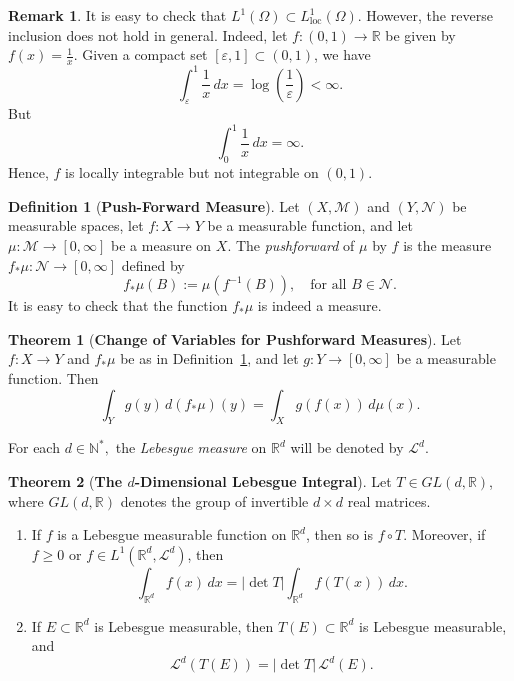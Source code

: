 \documentclass[12pt,a4paper]{report}
\theoremstyle{definition}
\newtheorem{theorem}{Theorem}
\newtheorem{definition}{Definition}
\newtheorem{remark}{Remark}
\begin{document}
\begin{remark}
It is easy to check that \( L^1(\Omega) \subset L^1_{\mathrm{loc}}(\Omega) \). However, the reverse inclusion does not hold in general. Indeed, let \( f : (0,1) \to \mathbb{R} \) be given by $f(x) = \frac{1}{x}$. Given a compact set \( [\varepsilon,1] \subset (0,1) \), we have
\[
\int_\varepsilon^1 \frac{1}{x} \, dx = \log\left(\frac{1}{\varepsilon}\right) < \infty.
\]
But
\[
\int_0^1 \frac{1}{x} \, dx = \infty.
\]
Hence, \( f \) is locally integrable but not integrable on \( (0,1) \).
\end{remark}


\begin{definition} [\textbf{Push-Forward Measure}] \label{pushforward}
Let \( (X, \mathcal{M}) \) and \( (Y, \mathcal{N}) \) be measurable spaces, let \( f : X \to Y \) be a measurable function, and let \( \mu : \mathcal{M} \to [0, \infty] \) be a measure on \( X \). The \textit{pushforward} of \( \mu \) by \( f \) is the measure \( f_*\mu : \mathcal{N} \to [0, \infty] \) defined by
\[
f_*\mu(B) := \mu(f^{-1}(B)), \quad \text{for all } B \in \mathcal{N}.
\]
It is easy to check that the function $f_*\mu$ is indeed a measure.
\end{definition}

\begin{theorem}[\textbf{Change of Variables for Pushforward Measures}] \label{lem:changeofvariable-pushforward}
Let \( f : X \to Y \) and \( f_* \mu \) be as in Definition~\ref{pushforward}, and let \( g : Y \to [0, \infty] \) be a measurable function. Then
\[
\int_Y g(y) \, d(f_* \mu)(y) = \int_X g(f(x)) \, d\mu(x).
\]
\end{theorem}

\noindent For each $d \in \mathbb{N}^*,$ the \textit{Lebesgue measure} on $\mathbb{R}^d$ will be denoted by $\mathcal{L}^d$.

\begin{theorem}[\textbf{The $d$-Dimensional Lebesgue Integral}] \label{thm2.45}
Let \( T \in GL(d, \mathbb{R}) \), where \( GL(d, \mathbb{R}) \) denotes the group of invertible \( d \times d \) real matrices.
\begin{enumerate}
    \item[(a)] If \( f \) is a Lebesgue measurable function on \( \mathbb{R}^d \), then so is \( f \circ T \). Moreover, if \( f \ge 0 \) or \( f \in L^1(\mathbb{R}^d, \mathcal{L}^d) \), then
    \[
    \int_{\mathbb{R}^d} f(x) \, dx = |\det T| \int_{\mathbb{R}^d} f(T(x)) \, dx.
    \]

    \item[(b)] If \( E \subset \mathbb{R}^d \) is Lebesgue measurable, then \( T(E) \subset \mathbb{R}^d \) is Lebesgue measurable, and
    \[
    \mathcal{L}^d(T(E)) = |\det T| \, \mathcal{L}^d(E).
    \]
\end{enumerate}
\end{theorem}
\end{document}

